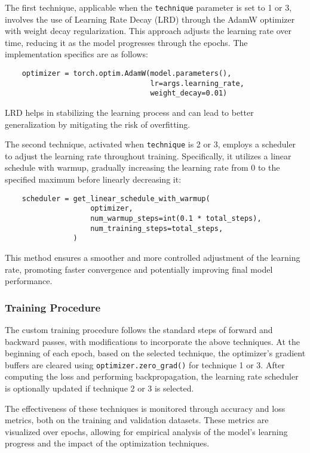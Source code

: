 The first technique, applicable when the \texttt{technique} parameter is set to 1 or 3, involves the use of Learning Rate Decay (LRD) through the AdamW optimizer with weight decay regularization. This approach adjusts the learning rate over time, reducing it as the model progresses through the epochs. The implementation specifics are as follows:
\begin{verbatim}
    optimizer = torch.optim.AdamW(model.parameters(), 
                                  lr=args.learning_rate, 
                                  weight_decay=0.01)
\end{verbatim}
LRD helps in stabilizing the learning process and can lead to better generalization by mitigating the risk of overfitting.

The second technique, activated when \texttt{technique} is 2 or 3, employs a scheduler to adjust the learning rate throughout training. Specifically, it utilizes a linear schedule with warmup, gradually increasing the learning rate from 0 to the specified maximum before linearly decreasing it:
\begin{verbatim}
    scheduler = get_linear_schedule_with_warmup(
                    optimizer,
                    num_warmup_steps=int(0.1 * total_steps),
                    num_training_steps=total_steps,
                )
\end{verbatim}
This method ensures a smoother and more controlled adjustment of the learning rate, promoting faster convergence and potentially improving final model performance.

\subsubsection*{Training Procedure}
The custom training procedure follows the standard steps of forward and backward passes, with modifications to incorporate the above techniques. At the beginning of each epoch, based on the selected technique, the optimizer's gradient buffers are cleared using \texttt{optimizer.zero\_grad()} for technique 1 or 3. After computing the loss and performing backpropagation, the learning rate scheduler is optionally updated if technique 2 or 3 is selected.

The effectiveness of these techniques is monitored through accuracy and loss metrics, both on the training and validation datasets. These metrics are visualized over epochs, allowing for empirical analysis of the model's learning progress and the impact of the optimization techniques.

